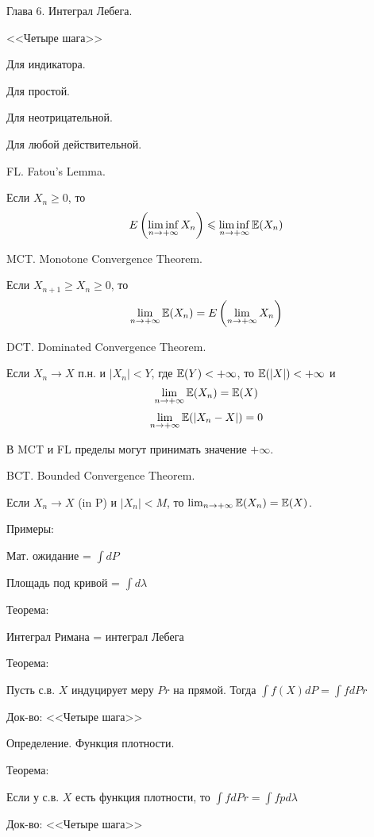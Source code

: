 {Глава 6. Интеграл Лебега. \par

<<Четыре шага>> \par
Для индикатора. \par 
Для простой. \par
Для неотрицательной. \par
Для любой действительной. \par

FL. Fatou's Lemma. \par
Если $X_{n}\ge 0$, то
$$
E\left(\liminf_{n\rightarrow +\infty}X_{n}\right)\leqslant
\liminf_{n\rightarrow +\infty}\mathbb{E}(X_{n})
$$

MCT. Monotone Convergence Theorem. \par
Если $X_{n+1} \ge X_{n} \ge 0$, то
$$
\lim_{n\rightarrow +\infty}\mathbb{E}(X_{n})=E\left(\lim_{n\rightarrow
+\infty}X_{n}\right)
$$

DCT. Dominated Convergence Theorem. \par
Если $X_{n}\rightarrow X$ п.н. и $|X_{n}|<Y$, где $\mathbb{E}(Y)<+\infty$,
то $\mathbb{E}(|X|)<+\infty$ и
$$ \lim_{n\rightarrow +\infty}\mathbb{E}(X_{n})=\mathbb{E}(X) $$
$$ \lim_{n\rightarrow+\infty}\mathbb{E}(|X_{n}-X|)=0 $$

В MCT и FL пределы могут принимать значение $+\infty$. \par

BCT. Bounded Convergence Theorem. \par
Если $X_{n}\rightarrow X$ (in P) и $|X_{n}|<M$, то
$\lim_{n\rightarrow +\infty}\mathbb{E}(X_{n})=\mathbb{E}(X)$. \par


Примеры: \par
Мат. ожидание = $\int dP$ \par
Площадь под кривой = $\int d\lambda$ \par

Теорема: \par
Интеграл Римана = интеграл Лебега \par

Теорема: \par
Пусть с.в. $X$ индуцирует меру $Pr$ на прямой. Тогда $\int f(X)dP=\int fdPr$ \par
Док-во: <<Четыре шага>> \par

Определение. Функция плотности. \par

Теорема: \par
Если у с.в. $X$ есть функция плотности, то $\int fdPr=\int fpd\lambda$ \par
Док-во: <<Четыре шага>> \par

}
